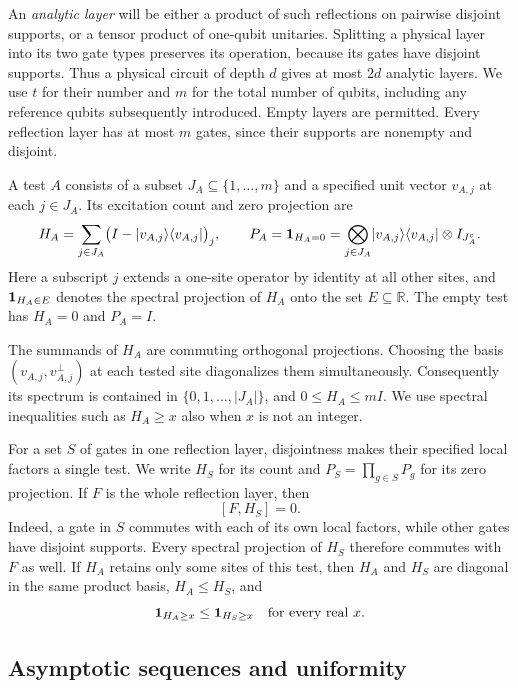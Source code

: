 An \emph{analytic layer} will be either a product of such reflections on
pairwise disjoint supports, or a tensor product of one-qubit unitaries.
Splitting a physical layer into its two gate types preserves its operation,
because its gates have disjoint supports.  Thus a physical circuit of depth
$d$ gives at most $2d$ analytic layers.  We use $t$ for their number and $m$
for the total number of qubits, including any reference qubits subsequently
introduced.  Empty layers are permitted.  Every reflection layer has at most
$m$ gates, since their supports are nonempty and disjoint.

\begin{definition}
\label{def:test}
A test $A$ consists of a subset $J_A\subseteq\{1,\ldots,m\}$ and a specified
unit vector $v_{A,j}$ at each $j\in J_A$.  Its excitation count and zero
projection are
\[
 H_A=\sum_{j\in J_A}
       \bigl(I-\lvert v_{A,j}\rangle\langle v_{A,j}\rvert\bigr)_j,
 \qquad
 P_A=\mathbf 1_{H_A=0}
    =\bigotimes_{j\in J_A}\lvert v_{A,j}\rangle\langle v_{A,j}\rvert
       \otimes I_{J_A^c}.
\]
Here a subscript $j$ extends a one-site operator by identity at all other
sites, and $\mathbf 1_{H_A\in E}$ denotes the spectral projection of $H_A$ onto
the set $E\subseteq\mathbb R$.  The empty test has $H_A=0$ and $P_A=I$.
\end{definition}

The summands of $H_A$ are commuting orthogonal projections.  Choosing the
basis $(v_{A,j},v_{A,j}^{\perp})$ at each tested site diagonalizes them
simultaneously.  Consequently its spectrum is contained in
$\{0,1,\ldots,|J_A|\}$, and $0\le H_A\le mI$.  We use spectral inequalities
such as $H_A\ge x$ also when $x$ is not an integer.

For a set $S$ of gates in one reflection layer, disjointness makes their
specified local factors a single test.  We write $H_S$ for its count and
$P_S=\prod_{g\in S}P_g$ for its zero projection.  If $F$ is the whole
reflection layer, then
\[
 [F,H_S]=0.
\]
Indeed, a gate in $S$ commutes with each of its own local factors, while
other gates have disjoint supports.  Every spectral projection of $H_S$
therefore commutes with $F$ as well.  If $H_A$ retains only some sites of
this test, then $H_A$ and $H_S$ are diagonal in the same product basis,
$H_A\le H_S$, and
\[
 \mathbf 1_{H_A\ge x}\le\mathbf 1_{H_S\ge x}
 \quad\text{for every real }x.
\]

\subsection{Asymptotic sequences and uniformity}

